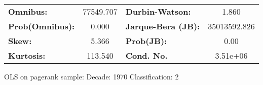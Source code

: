 \begin{center}
\begin{tabular}{lccccc}
\bottomrule
\end{tabular}
\begin{tabular}{lclc}
\textbf{Omnibus:}       & 77549.707 & \textbf{  Durbin-Watson:     } &      1.860    \\
\textbf{Prob(Omnibus):} &    0.000  & \textbf{  Jarque-Bera (JB):  } & 35013592.826  \\
\textbf{Skew:}          &    5.366  & \textbf{  Prob(JB):          } &       0.00    \\
\textbf{Kurtosis:}      &  113.540  & \textbf{  Cond. No.          } &   3.51e+06    \\
\bottomrule
\end{tabular}
\end{center}
\break
OLS on pagerank sample: Decade: 1970 Classification: 2
